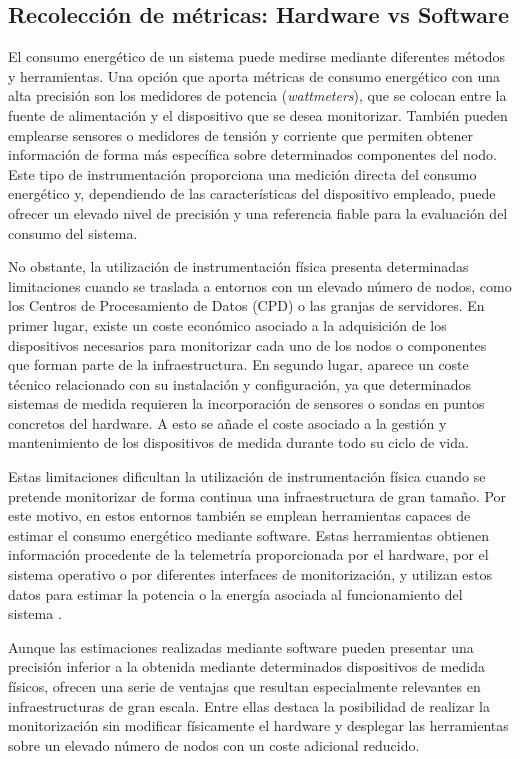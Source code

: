 \subsection{Recolección de métricas: Hardware vs Software}
 El consumo energético de un sistema puede medirse mediante diferentes métodos y herramientas. Una opción que aporta métricas de consumo energético con una alta precisión son los medidores de potencia (\textit{wattmeters}), que se colocan entre la fuente de alimentación y el dispositivo que se desea monitorizar. También pueden emplearse sensores o medidores de tensión y corriente que permiten obtener información de forma más específica sobre determinados componentes del nodo. Este tipo de instrumentación proporciona una medición directa del consumo energético y, dependiendo de las características del dispositivo empleado, puede ofrecer un elevado nivel de precisión y una referencia fiable para la evaluación del consumo del sistema.
 
 No obstante, la utilización de instrumentación física presenta determinadas limitaciones cuando se traslada a entornos con un elevado número de nodos, como los Centros de Procesamiento de Datos (CPD) o las granjas de servidores. En primer lugar, existe un coste económico asociado a la adquisición de los dispositivos necesarios para monitorizar cada uno de los nodos o componentes que forman parte de la infraestructura. En segundo lugar, aparece un coste técnico relacionado con su instalación y configuración, ya que determinados sistemas de medida requieren la incorporación de sensores o sondas en puntos concretos del hardware. A esto se añade el coste asociado a la gestión y mantenimiento de los dispositivos de medida durante todo su ciclo de vida.
 
 Estas limitaciones dificultan la utilización de instrumentación física cuando se pretende monitorizar de forma continua una infraestructura de gran tamaño. Por este motivo, en estos entornos también se emplean herramientas capaces de estimar el consumo energético mediante software. Estas herramientas obtienen información procedente de la telemetría proporcionada por el hardware, por el sistema operativo o por diferentes interfaces de monitorización, y utilizan estos datos para estimar la potencia o la energía asociada al funcionamiento del sistema \cite{power-consumption-estimation-models}.
 
 Aunque las estimaciones realizadas mediante software pueden presentar una precisión inferior a la obtenida mediante determinados dispositivos de medida físicos, ofrecen una serie de ventajas que resultan especialmente relevantes en infraestructuras de gran escala. Entre ellas destaca la posibilidad de realizar la monitorización sin modificar físicamente el hardware y desplegar las herramientas sobre un elevado número de nodos con un coste adicional reducido.
 
